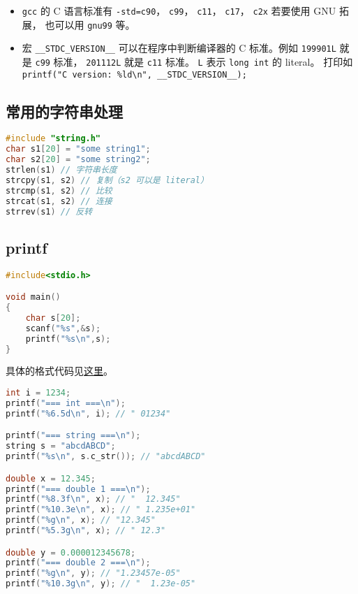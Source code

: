 
\begin{itemize}
\item \verb`gcc` 的 C 语言标准有 \verb`-std=c90`， \verb`c99`， \verb`c11`， \verb`c17`， \verb`c2x` 若要使用 GNU 拓展， 也可以用 \verb`gnu99` 等。
\item 宏 \verb`__STDC_VERSION__` 可以在程序中判断编译器的 C 标准。例如 \verb`199901L` 就是 \verb`c99` 标准， \verb`201112L` 就是 \verb`c11` 标准。 \verb`L` 表示 \verb`long int` 的 literal。 打印如 \verb`printf("C version: %ld\n", __STDC_VERSION__);`
\end{itemize}


\subsection{常用的字符串处理}
\begin{lstlisting}[language=cpp]
#include "string.h"
char s1[20] = "some string1";
char s2[20] = "some string2";
strlen(s1) // 字符串长度
strcpy(s1, s2) // 复制（s2 可以是 literal）
strcmp(s1, s2) // 比较
strcat(s1, s2) // 连接
strrev(s1) // 反转
\end{lstlisting}

\subsection{printf}
\begin{lstlisting}[language=cpp]
#include<stdio.h>

void main()
{
    char s[20];
    scanf("%s",&s);
    printf("%s\n",s);
}
\end{lstlisting}
具体的格式代码见\href{https://www.tutorialspoint.com/c_standard_library/c_function_printf.htm}{这里}。

\begin{lstlisting}[language=cpp]
int i = 1234;
printf("=== int ===\n");
printf("%6.5d\n", i); // " 01234"

printf("=== string ===\n");
string s = "abcdABCD";
printf("%s\n", s.c_str()); // "abcdABCD"

double x = 12.345;
printf("=== double 1 ===\n");
printf("%8.3f\n", x); // "  12.345"
printf("%10.3e\n", x); // " 1.235e+01"
printf("%g\n", x); // "12.345"
printf("%5.3g\n", x); // " 12.3"

double y = 0.000012345678;
printf("=== double 2 ===\n");
printf("%g\n", y); // "1.23457e-05"
printf("%10.3g\n", y); // "  1.23e-05"
\end{lstlisting}

